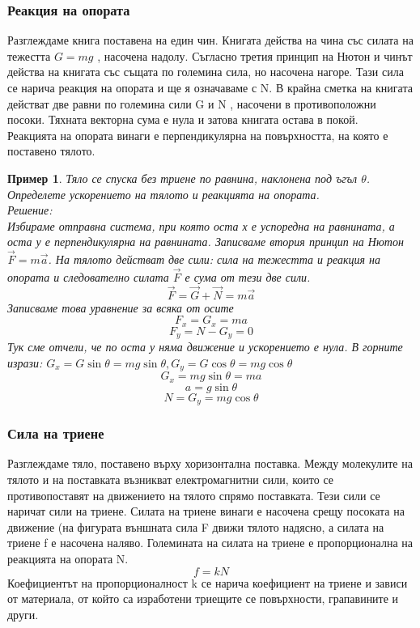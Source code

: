\documentclass[fleqn]{article}
\newtheorem{example}{Пример}[subsection]
\begin{document}
\subsubsection{Реакция на опората}
Разглеждаме книга поставена на един чин. Книгата действа на чина със силата на тежестта $G = mg$ , насочена надолу. Съгласно третия принцип на Нютон и чинът действа на книгата със същата по големина сила, но насочена нагоре. Тази сила се нарича реакция на опората и ще я означаваме с N. В крайна сметка на книгата действат две равни по големина сили G и N , насочени в противоположни посоки. Тяхната векторна сума е нула и затова книгата остава в покой. \\
Реакцията на опората винаги е перпендикулярна на повърхността, на която е поставено тялото.
 
\begin{example}
Тяло се спуска без триене по равнина, наклонена под ъгъл $\theta$. Определете ускорението на тялото и реакцията на опората. \\
Решение: \\
Избираме отправна система, при която оста х е успоредна на равнината, а оста у е перпендикулярна на равнината. Записваме втория принцип на Нютон $\vec{F} = m \vec{a}$. На тялото действат две сили: сила на тежестта и реакция на опората и следователно силата $\vec{F}$ е сума от тези две сили.
$$\vec{F} = \vec{G} + \vec{N} = m \vec{a} $$
Записваме това уравнение за всяка от осите
$$F_x = G_x = ma$$
$$F_y = N - G_y = 0$$
Тук сме отчели, че по оста у няма движение и ускорението е нула. В горните изрази: $G_x  =G \sin{\theta} = mg \sin{\theta}, G_y  =G \cos{\theta} = mg \cos{\theta}$\\
$$G_x = mg \sin{\theta} = ma$$
$$a =g\sin{\theta}$$
$$N = G_y = mg \cos{\theta}$$
\end{example}

\subsubsection{Сила на триене}
Разглеждаме тяло, поставено върху хоризонтална поставка. Между молекулите на тялото и на поставката възникват електромагнитни сили, които се противопоставят на движението на тялото спрямо поставката. Тези сили се наричат сили на триене. Силата на триене винаги е насочена срещу посоката на движение (на фигурата външната сила F движи тялото надясно, а силата на триене f е насочена наляво. Големината на силата на триене е пропорционална на реакцията на опората N.
$$f = kN$$
Коефициентът на пропорционалност k се нарича коефициент на триене и зависи от материала, от който са изработени триещите се повърхности, грапавините и други.
\end{document}
